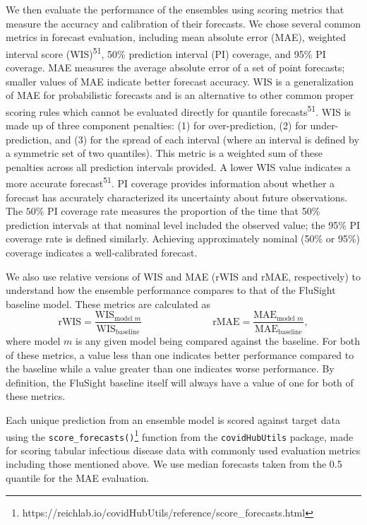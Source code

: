 \documentclass[
]{article}
\begin{document}
We then evaluate the performance of the ensembles using scoring metrics
that measure the accuracy and calibration of their forecasts. We chose
several common metrics in forecast evaluation, including mean absolute
error (MAE), weighted interval score (WIS)\textsuperscript{51}, 50\%
prediction interval (PI) coverage, and 95\% PI coverage. MAE measures
the average absolute error of a set of point forecasts; smaller values
of MAE indicate better forecast accuracy. WIS is a generalization of MAE
for probabilistic forecasts and is an alternative to other common proper
scoring rules which cannot be evaluated directly for quantile
forecasts\textsuperscript{51}. WIS is made up of three component
penalties: (1) for over-prediction, (2) for under-prediction, and (3)
for the spread of each interval (where an interval is defined by a
symmetric set of two quantiles). This metric is a weighted sum of these
penalties across all prediction intervals provided. A lower WIS value
indicates a more accurate forecast\textsuperscript{51}. PI coverage
provides information about whether a forecast has accurately
characterized its uncertainty about future observations. The \(50\)\% PI
coverage rate measures the proportion of the time that 50\% prediction
intervals at that nominal level included the observed value; the 95\% PI
coverage rate is defined similarly. Achieving approximately nominal
(50\% or 95\%) coverage indicates a well-calibrated forecast.

We also use relative versions of WIS and MAE (rWIS and rMAE,
respectively) to understand how the ensemble performance compares to
that of the FluSight baseline model. These metrics are calculated as
\[\textrm{rWIS} = \frac{\textrm{WIS}_{\textrm{model }m}}{\textrm{WIS}_{\textrm{baseline}}} \hspace{3cm} \textrm{rMAE} = \frac{\textrm{MAE}_{\textrm{model }m}}{\textrm{MAE}_{\textrm{baseline}}},\]
where model \(m\) is any given model being compared against the
baseline. For both of these metrics, a value less than one indicates
better performance compared to the baseline while a value greater than
one indicates worse performance. By definition, the FluSight baseline
itself will always have a value of one for both of these metrics.

Each unique prediction from an ensemble model is scored against target
data using the \texttt{score\_forecasts()}\footnote{https://reichlab.io/covidHubUtils/reference/score\_forecasts.html}
function from the \texttt{covidHubUtils} package, made for scoring
tabular infectious disease data with commonly used evaluation metrics
including those mentioned above. We use median forecasts taken from the
0.5 quantile for the MAE evaluation.
\end{document}
